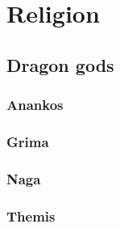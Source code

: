 \section{Religion}
\subsection{Dragon gods}
\subsubsection{Anankos}
\label{religion:anankos}

\subsubsection{Grima}
\label{religion:grima}

\subsubsection{Naga}
\label{religion:naga}

\subsubsection{Themis}
\label{religion:themis}
